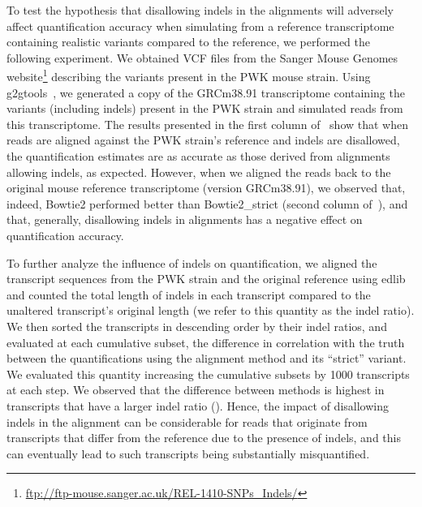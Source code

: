 To test the hypothesis that disallowing indels in the alignments will adversely
affect quantification accuracy when simulating from a reference transcriptome
containing realistic variants compared to the reference, we performed the
following experiment. We obtained VCF files from the Sanger Mouse Genomes
website\footnote{\url{ftp://ftp-mouse.sanger.ac.uk/REL-1410-SNPs_Indels/}}
describing the variants present in the PWK mouse strain. Using
g2gtools~\cite{g2gtools}, we generated a copy of the GRCm38.91 transcriptome containing
the variants (including indels) present in the PWK strain and simulated reads
from this transcriptome. The results presented in the first column
of~ show that when reads are aligned against the PWK strain's
reference and indels are disallowed, the quantification estimates are as
accurate as those derived from alignments allowing indels, as expected. However, when we aligned the
reads back to the original mouse reference transcriptome (version GRCm38.91), we
observed that, indeed, Bowtie2 performed better than Bowtie2\_strict (second column
of~), and that, generally, disallowing indels in alignments has
a negative effect on quantification accuracy.

To further analyze the influence of indels on quantification, we aligned the
transcript sequences from the PWK strain and the original reference using
edlib~\cite{vsovsic2017edlib} and counted the total length of indels in each
transcript compared to the unaltered transcript's original length (we refer to
this quantity as the indel ratio). We then sorted the transcripts in descending
order by their indel ratios, and evaluated at each cumulative subset, the
difference in correlation with the truth between the quantifications using the
alignment method and its ``strict'' variant. We evaluated this quantity
increasing the cumulative subsets by 1000 transcripts at each step. We observed
that the difference between methods is highest in transcripts that have a larger
indel ratio (). Hence, the impact of disallowing indels in
the alignment can be considerable for reads that originate from transcripts that
differ from the reference due to the presence of indels, and this can eventually lead
to such transcripts being substantially misquantified.

